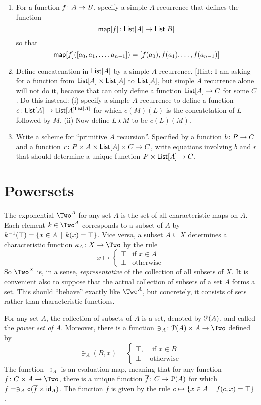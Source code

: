 \begin{exercises}
	\begin{enumerate}
		\item For a function ${f}\colon{A}\to{B}$, specify a simple $A$ recurrence that defines the function
			\[{\mathord{\textsf{map}}[f]}\colon{\mathord{\textsf{List}}[A]}\to{\mathord{\textsf{List}}[B]}\] so that \[\mathord{\textsf{map}}[f]([a_0,a_1,\ldots, a_{n-1}]) = [f(a_0),f(a_1),\ldots, f(a_{n-1})]\]
		\item Define concatenation in $\mathord{\textsf{List}}[A]$ by a simple $A$ recurrence. [Hint: I am asking for a function from $\mathord{\textsf{List}}[A]\times \mathord{\textsf{List}}[A]$ to $\mathord{\textsf{List}}[A]$, but simple $A$ recurrence alone will not do it, because that can only define a function $\mathord{\textsf{List}}[A]\to C$ for some  $C$. Do this instead: (i) specify a simple $A$ recurrence to define a function ${c}\colon{\mathord{\textsf{List}}[A]}\to{\mathord{\textsf{List}}[A]^{\mathord{\textsf{List}}[A]}}$ for which $c(M)(L)$ is the concatetation of $L$ followed by $M$, (ii) Now define $L\star M$ to be $c(L)(M)$.
		\item Write a scheme for ``primitive $A$ recursion''. Specified by a function ${b}\colon{P}\to{C}$ and a function ${r}\colon{P\times A\times \mathord{\textsf{List}}[A] \times C}\to{C}$,
		write equations involving $b$ and $r$ that should determine a unique function $P\times \mathord{\textsf{List}}[A]\to C$. 
	\end{enumerate}
\end{exercises}

\chapter{Powersets}

The exponential $\Two^A$ for any set $A$ is the set of all characteristic maps on $A$.
Each element $k\in \Two^A$ corresponds to a subset of $A$ by $k^{-1}(\top) = \{x\in A\,\mid\, k(x)=\top\}$. Vice versa, a subset $A\subseteq X$ determines a characteristic function $\fromto {\kappa_A}X\Two$ by the rule
\[x\mapsto \begin{cases}
			\top &\text{if $x\in A$}\\
			\bot &\text{otherwise}
\end{cases}
\]
So $\Two^X$ is, in a sense, \emph{representative} of the collection of all subsets of $X$. 
It is convenient also to suppose that the actual collection of subsets of a set $A$ forms a set.
This should ``behave'' exactly like $\Two^A$, but concretely, it consists of sets rather than characteristic functions.

\begin{principle}\label{ax:powerset}
	For any set $A$, the collection of subsets of $A$ is a set, denoted by ${\mathcal{P}}(A)$, and called the \emph{power set of $A$}. Moreover, there is a function $\fromto {\ni_A}{\powerset(A)\times A}\Two$ defined by 
	\[\ni_A(B,x) = \begin{cases}
	\top, &\text{ if } x\in B\\
	\bot &\text{otherwise}
	\end{cases}
	\]
	The function $\ni_A$ is an evaluation map, meaning that 
	for any function $\fromto f{C\times A}\Two$, there is a unique function ${\overline{f}}\colon{C}\to{{\mathcal{P}}(A)}$ for which $f = \ni_A\circ (\overline{f} \times \textsf{id}_A)$. The function $\overline f$ 
	is given by the rule $c\mapsto \{x\in A\,\mid\, f(c,x)=\top\}$.
\end{principle}

